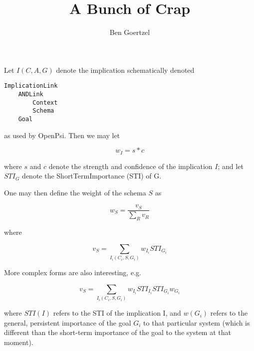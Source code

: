 \documentclass[10pt]{article}
\title{A Bunch of Crap}
\author{Ben Goertzel}
\begin{document}
\maketitle


Let $I(C,A,G)$ denote the implication schematically denoted

\begin{verbatim}
ImplicationLink
    ANDLink
        Context
        Schema
    Goal
\end{verbatim}

\noindent as used by OpenPsi.   Then we may let

$$
w_I = s * c
$$

\noindent where $s$ and $c$ denote the strength and confidence of the implication $I$; and let $STI_G$ 
denote the ShortTermImportance (STI) of G.   

One may then define the weight of the schema $S$ as


$$
w_S = \frac{v_S} {\sum_R v_R}
$$

\noindent where

$$
v_S = \sum_{I_i(C_i, S, G_i)} w_{I_i} STI_{G_i}
$$

More complex forms are also interesting, e.g.

$$
v_S = \sum_{I_i(C_i, S, G_i)} w_{I_i} STI_{I_i} STI_{G_i}  w_{G_i}
$$
 
 \noindent where $STI(I)$ refers to the STI of the implication I, and
 $w(G_i)$ refers to the general, persistent importance of the goal $G_i$
 to that particular system (which is different than the short-term importance
 of the goal to the system at that moment).
\end{document}

